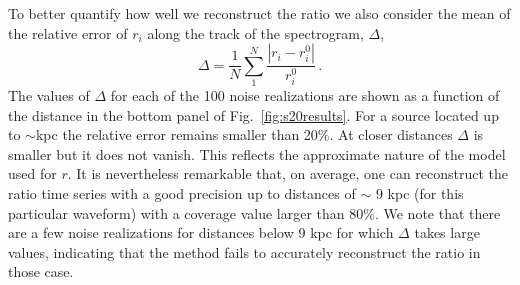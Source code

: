 To better quantify how well we reconstruct the ratio we also consider  the mean of the relative error of $r_i$ along 
the track of the spectrogram, $\Delta$,  
\begin{equation}
\Delta=\frac{1}{N}\sum_1^N\frac{|r_i-r_i^0|}{r_i^0}\,.
\end{equation}
The values of $\Delta$ for each of the 100 noise realizations are shown as a function of the distance
in the bottom panel of Fig.~\ref{fig:s20results}. For a source located up to $\sim$\unit[9]{kpc} the relative error
remains smaller than 20\%. At closer distances $\Delta$ is smaller but it does not vanish. This reflects the approximate nature of the model used for $r$. It is nevertheless remarkable that, on average, one can reconstruct the ratio time series with a good
precision up to distances of $\sim$ 9 kpc (for this particular waveform) with a coverage value
larger than 80\%. We note that there are a few noise realizations for distances below 9 kpc for which
$\Delta$ takes large values, indicating that the method fails to accurately reconstruct the ratio in those case. 

